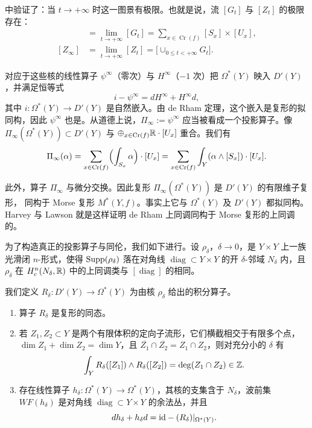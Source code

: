 \cite{HL} 中验证了：当 $t\to+\infty$ 时这一图景有极限。也就是说，流 $[G_t]$ 与 $[Z_t]$ 的极限存在：
\begin{align*}
  [G_\infty]&=\lim_{t\to+\infty}[G_t]=\sum_{x\in\operatorname{Cr}(f)}[S_x]\times[U_x],\\
  [Z_\infty]&=\lim_{t\to+\infty}[Z_t]=\bigl[\cup_{0\le t<+\infty}G_t\bigr].
\end{align*}

对应于这些核的线性算子 $\psi^\infty$（零次）与 $H^\infty$（$-1$ 次）把 $\Omega^*(Y)$ 映入
$D'(Y)$，并满足恒等式
\[
  i-\psi^\infty=dH^\infty+H^\infty d,
\]
其中 $i:\Omega^*(Y)\to D'(Y)$ 是自然嵌入。由 de Rham 定理，这个嵌入是复形的拟同构，因此
$\psi^\infty$ 也是。从道德上说，$\Pi_\infty:=\psi^\infty$ 应当被看成一个投影算子。像
$\Pi_\infty(\Omega^*(Y))\subset D'(Y)$ 与 $\oplus_{x\in\operatorname{Cr}(f)}\mathbb{R}\cdot[U_x]$ 重合。我们有
\[
  \Pi_\infty(\alpha)=\sum_{x\in\operatorname{Cr}(f)}\Bigl(\int_{S_x}\alpha\Bigr)\cdot[U_x]
  =\sum_{x\in\operatorname{Cr}(f)}\int_Y(\alpha\wedge[S_x])\cdot[U_x].
\]

此外，算子 $\Pi_\infty$ 与微分交换。因此复形 $\Pi_\infty(\Omega^*(Y))$ 是 $D'(Y)$ 的有限维子复形，
同构于 Morse 复形 $M^*(Y,f)$。事实上它与 $\Omega^*(Y)$ 及 $D'(Y)$ 都拟同构。Harvey 与 Lawson
就是这样证明 de Rham 上同调同构于 Morse 复形的上同调的。

为了构造真正的投影算子与同伦，我们如下进行。设 $\rho_\delta$，$\delta\to0$，是 $Y\times Y$ 上一族
光滑闭 $n$-形式，使得 $\operatorname{Supp}(\rho_\delta)$ 落在对角线 $\operatorname{diag}\subset Y\times Y$ 的开
$\delta$-邻域 $N_\delta$ 内，且 $\rho_\delta$ 在 $H^n_c(N_\delta,\mathbb{R})$ 中的上同调类与
$[\operatorname{diag}]$ 的相同。

我们定义 $R_\delta:D'(Y)\to\Omega^*(Y)$ 为由核 $\rho_\delta$ 给出的积分算子。

\begin{lmm}
\begin{enumerate}[label=\arabic*),leftmargin=2.6em]
  \item 算子 $R_\delta$ 是复形的同态。
  \item 若 $Z_1,Z_2\subset Y$ 是两个有限体积的定向子流形，它们横截相交于有限多个点，
  $\dim Z_1+\dim Z_2=\dim Y$，且 $\overline{Z_1}\cap\overline{Z_2}=Z_1\cap Z_2$，则对充分小的
  $\delta$ 有
  \[
    \int_Y R_\delta([Z_1])\wedge R_\delta([Z_2])=\deg(Z_1\cap Z_2)\in\mathbb{Z}.
  \]
  \item 存在线性算子 $h_\delta:\Omega^*(Y)\to\Omega^*(Y)$，其核的支集含于 $N_\delta$，波前集
  $WF(h_\delta)$ 是对角线 $\operatorname{diag}\subset Y\times Y$ 的余法丛，并且
  \[
    dh_\delta+h_\delta d=\mathrm{id}-(R_\delta)|_{\Omega^*(Y)}.
  \]
\end{enumerate}
\end{lmm}

